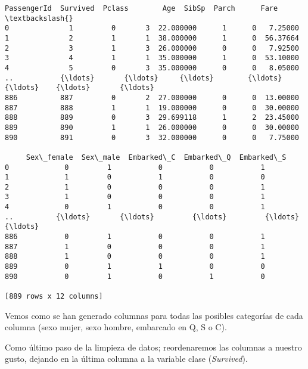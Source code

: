 \documentclass[11pt]{article}
\makeatletter
\newcommand{\boxspacing}{\kern\kvtcb@left@rule\kern\kvtcb@boxsep}
\newcommand{\prompt}[4]{
        \ttfamily\llap{{\color{#2}[#3]:\hspace{3pt}#4}}\vspace{-\baselineskip}
    }
\makeatother
\begin{document}
            \begin{tcolorbox}[breakable, size=fbox, boxrule=.5pt, pad at break*=1mm, opacityfill=0]
\prompt{Out}{outcolor}{16}{\boxspacing}
\begin{Verbatim}[commandchars=\\\{\}]
     PassengerId  Survived  Pclass        Age  SibSp  Parch      Fare  \textbackslash{}
0              1         0       3  22.000000      1      0   7.25000
1              2         1       1  38.000000      1      0  56.37664
2              3         1       3  26.000000      0      0   7.92500
3              4         1       1  35.000000      1      0  53.10000
4              5         0       3  35.000000      0      0   8.05000
..           {\ldots}       {\ldots}     {\ldots}        {\ldots}    {\ldots}    {\ldots}       {\ldots}
886          887         0       2  27.000000      0      0  13.00000
887          888         1       1  19.000000      0      0  30.00000
888          889         0       3  29.699118      1      2  23.45000
889          890         1       1  26.000000      0      0  30.00000
890          891         0       3  32.000000      0      0   7.75000

     Sex\_female  Sex\_male  Embarked\_C  Embarked\_Q  Embarked\_S
0             0         1           0           0           1
1             1         0           1           0           0
2             1         0           0           0           1
3             1         0           0           0           1
4             0         1           0           0           1
..          {\ldots}       {\ldots}         {\ldots}         {\ldots}         {\ldots}
886           0         1           0           0           1
887           1         0           0           0           1
888           1         0           0           0           1
889           0         1           1           0           0
890           0         1           0           1           0

[889 rows x 12 columns]
\end{Verbatim}
\end{tcolorbox}
        
    Vemos como se han generado columnas para todas las posibles categorías
de cada columna (sexo mujer, sexo hombre, embarcado en Q, S o C).

    Como último paso de la limpieza de datos; reordenaremos las columnas a
nuestro gusto, dejando en la última columna a la variable clase
(\emph{Survived}).
\end{document}
